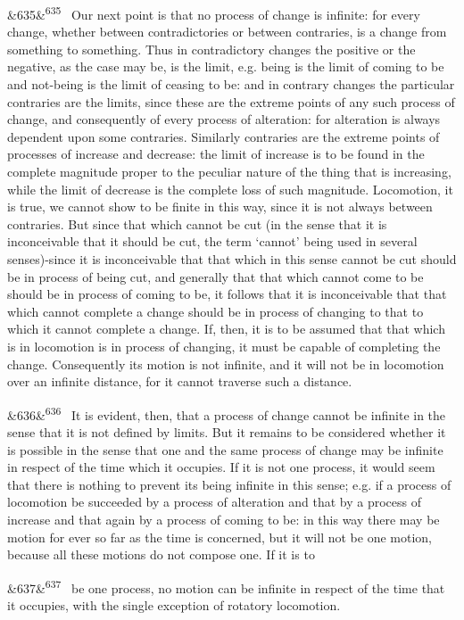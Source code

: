\documentclass[12pt]{article}
\newcommand{\para}[1][]{\par\noindent\ifx&#1&\else\textsuperscript{\footnotesize #1}~\fi}
\begin{document}
\para[635] Our next point is that no process of change is infinite: for every change, whether between contradictories or between contraries, is a change from something to something. Thus in contradictory changes the positive or the negative, as the case may be, is the limit, e.g. being is the limit of coming to be and not-being is the limit of ceasing to be: and in contrary changes the particular contraries are the limits, since these are the extreme points of any such process of change, and consequently of every process of alteration: for alteration is always dependent upon some contraries. Similarly contraries are the extreme points of processes of increase and decrease: the limit of increase is to be found in the complete magnitude proper to the peculiar nature of the thing that is increasing, while the limit of decrease is the complete loss of such magnitude. Locomotion, it is true, we cannot show to be finite in this way, since it is not always between contraries. But since that which cannot be cut (in the sense that it is inconceivable that it should be cut, the term ‘cannot’ being used in several senses)-since it is inconceivable that that which in this sense cannot be cut should be in process of being cut, and generally that that which cannot come to be should be in process of coming to be, it follows that it is inconceivable that that which cannot complete a change should be in process of changing to that to which it cannot complete a change. If, then, it is to be assumed that that which is in locomotion is in process of changing, it must be capable of completing the change. Consequently its motion is not infinite, and it will not be in locomotion over an infinite distance, for it cannot traverse such a distance.

\para[636] It is evident, then, that a process of change cannot be infinite in the sense that it is not defined by limits. But it remains to be considered whether it is possible in the sense that one and the same process of change may be infinite in respect of the time which it occupies. If it is not one process, it would seem that there is nothing to prevent its being infinite in this sense; e.g. if a process of locomotion be succeeded by a process of alteration and that by a process of increase and that again by a process of coming to be: in this way there may be motion for ever so far as the time is concerned, but it will not be one motion, because all these motions do not compose one. If it is to

\para[637] be one process, no motion can be infinite in respect of the time that it occupies, with the single exception of rotatory locomotion.
\end{document}
